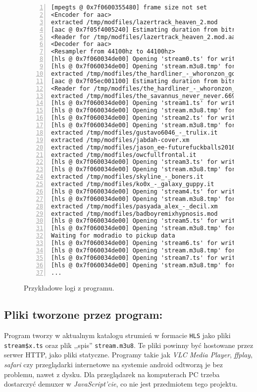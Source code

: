 \documentclass[a4paper,12pt]{article}
\begin{document}
\begin{figure}[t]
\begin{lstlisting}[frame=LB,basicstyle=\ttfamily\scriptsize, numbers=left]
[mpegts @ 0x7f0600355480] frame size not set
<Encoder for aac>
extracted /tmp/modfiles/lazertrack_heaven_2.mod
[aac @ 0x7f05f4005240] Estimating duration from bitrate, this may be inaccurate
<Reader for /tmp/modfiles/lazertrack_heaven_2.mod.aac>
<Decoder for aac>
<Resampler from 44100hz to 44100hz>
[hls @ 0x7f060034de00] Opening 'stream0.ts' for writing
[hls @ 0x7f060034de00] Opening 'stream.m3u8.tmp' for writing
extracted /tmp/modfiles/the_hardliner_-_whoronzon_gohonzon.xm
[aac @ 0x7f05ec001100] Estimating duration from bitrate, this may be inaccurate
<Reader for /tmp/modfiles/the_hardliner_-_whoronzon_gohonzon.xm.aac>
extracted /tmp/modfiles/the_savannus_never_never.669
[hls @ 0x7f060034de00] Opening 'stream1.ts' for writing
[hls @ 0x7f060034de00] Opening 'stream.m3u8.tmp' for writing
[hls @ 0x7f060034de00] Opening 'stream2.ts' for writing
[hls @ 0x7f060034de00] Opening 'stream.m3u8.tmp' for writing
extracted /tmp/modfiles/gustavo6046_-_trulix.it
extracted /tmp/modfiles/jabdah-cover.xm
extracted /tmp/modfiles/jason_ee-futurefuckballs2010_cover.it
extracted /tmp/modfiles/owcfullfrontal.it
[hls @ 0x7f060034de00] Opening 'stream3.ts' for writing
[hls @ 0x7f060034de00] Opening 'stream.m3u8.tmp' for writing
extracted /tmp/modfiles/skyline_-_boners.it
extracted /tmp/modfiles/ko0x_-_galaxy_guppy.it
[hls @ 0x7f060034de00] Opening 'stream4.ts' for writing
[hls @ 0x7f060034de00] Opening 'stream.m3u8.tmp' for writing
extracted /tmp/modfiles/pasyada_alex_-_decil.xm
extracted /tmp/modfiles/badboyremixhypnosis.mod
[hls @ 0x7f060034de00] Opening 'stream5.ts' for writing
[hls @ 0x7f060034de00] Opening 'stream.m3u8.tmp' for writing
Waiting for modradio to pickup data
[hls @ 0x7f060034de00] Opening 'stream6.ts' for writing
[hls @ 0x7f060034de00] Opening 'stream.m3u8.tmp' for writing
[hls @ 0x7f060034de00] Opening 'stream7.ts' for writing
[hls @ 0x7f060034de00] Opening 'stream.m3u8.tmp' for writing
...
\end{lstlisting}
\centering
    \caption{Przykładowe logi z programu.}
    \label{lst:logs}
\end{figure}

\subsection*{Pliki tworzone przez program:}

Program tworzy w aktualnym katalogu strumień w formacie \texttt{HLS} jako pliki
\texttt{stream\$x.ts} oraz plik ,,spis'' \texttt{stream.m3u8}. Te pliki powinny
być hostowane przez serwer HTTP, jako pliki statyczne. Programy takie jak
\emph{VLC Media Player}, \emph{ffplay}, \emph{safari} czy przeglądarki
internetowe na systemie android odtworzą je bez problemu, nawet z dysku. Dla
przeglądarek na komputerach PC trzeba dostarczyć demuxer w
\emph{JavaScript'cie}, co nie jest przedmiotem tego projektu.
\end{document}
